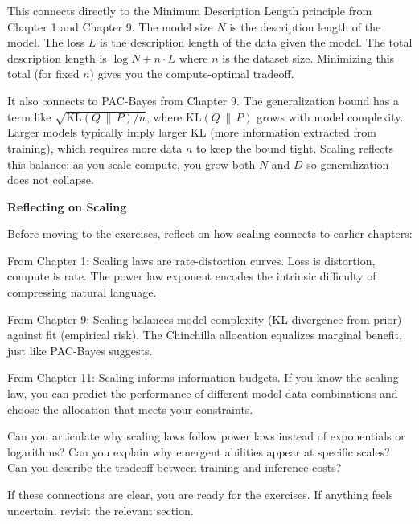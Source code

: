 This connects directly to the Minimum Description Length principle from Chapter 1 and Chapter 9. The model size $N$ is the description length of the model. The loss $L$ is the description length of the data given the model. The total description length is $\log N + n \cdot L$ where $n$ is the dataset size. Minimizing this total (for fixed $n$) gives you the compute-optimal tradeoff.

It also connects to PAC-Bayes from Chapter 9. The generalization bound has a term like $\sqrt{\mathrm{KL}(Q\,\|\,P)/n}$, where $\mathrm{KL}(Q\,\|\,P)$ grows with model complexity. Larger models typically imply larger KL (more information extracted from training), which requires more data $n$ to keep the bound tight. Scaling reflects this balance: as you scale compute, you grow both $N$ and $D$ so generalization does not collapse.

\vspace{1em}

\begin{pausebox}
\textbf{Reflecting on Scaling}

\vspace{0.5em}

Before moving to the exercises, reflect on how scaling connects to earlier chapters:

\vspace{0.5em}

From Chapter 1: Scaling laws are rate-distortion curves. Loss is distortion, compute is rate. The power law exponent encodes the intrinsic difficulty of compressing natural language.

\vspace{0.5em}

From Chapter 9: Scaling balances model complexity (KL divergence from prior) against fit (empirical risk). The Chinchilla allocation equalizes marginal benefit, just like PAC-Bayes suggests.

\vspace{0.5em}

From Chapter 11: Scaling informs information budgets. If you know the scaling law, you can predict the performance of different model-data combinations and choose the allocation that meets your constraints.

\vspace{0.5em}

Can you articulate why scaling laws follow power laws instead of exponentials or logarithms? Can you explain why emergent abilities appear at specific scales? Can you describe the tradeoff between training and inference costs?

\vspace{0.5em}

If these connections are clear, you are ready for the exercises. If anything feels uncertain, revisit the relevant section.
\end{pausebox}


